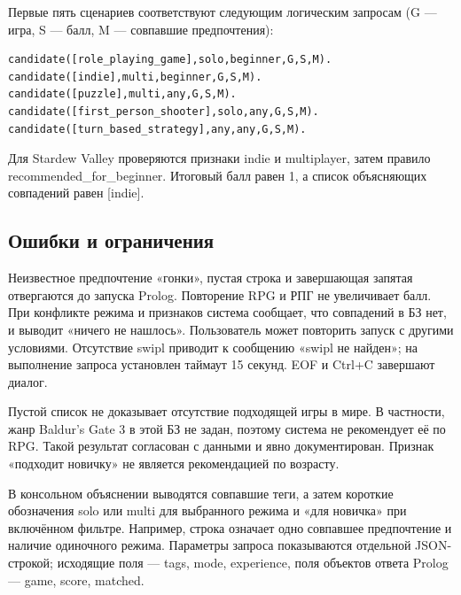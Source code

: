 \noindent\begin{minipage}{\linewidth}
Первые пять сценариев соответствуют следующим логическим запросам
(G --- игра, S --- балл, M --- совпавшие предпочтения):
\begin{lstlisting}
candidate([role_playing_game],solo,beginner,G,S,M).
candidate([indie],multi,beginner,G,S,M).
candidate([puzzle],multi,any,G,S,M).
candidate([first_person_shooter],solo,any,G,S,M).
candidate([turn_based_strategy],any,any,G,S,M).
\end{lstlisting}
\end{minipage}\par
Для Stardew Valley проверяются признаки indie и multiplayer, затем правило
recommended\_for\_beginner. Итоговый балл равен 1,
а список объясняющих совпадений равен [indie].

\subsection{Ошибки и ограничения}
Неизвестное предпочтение «гонки», пустая строка и завершающая запятая отвергаются
до запуска Prolog. Повторение RPG и РПГ не увеличивает балл.
При конфликте режима и признаков система сообщает, что совпадений в БЗ нет,
и выводит «ничего не нашлось». Пользователь может повторить запуск с другими условиями.
Отсутствие swipl приводит к сообщению «swipl не найден»;
на выполнение запроса установлен таймаут 15 секунд. EOF и Ctrl+C завершают диалог.

Пустой список не доказывает отсутствие подходящей игры в мире.
В частности, жанр Baldur's Gate 3 в этой БЗ не задан, поэтому система не
рекомендует её по RPG. Такой результат согласован с данными и явно документирован.
Признак «подходит новичку» не является рекомендацией по возрасту.

В консольном объяснении выводятся совпавшие теги, а затем короткие обозначения
solo или multi для выбранного режима и «для новичка» при включённом фильтре.
Например, строка  означает одно
совпавшее предпочтение и наличие одиночного режима. Параметры запроса
показываются отдельной JSON-строкой; исходящие поля --- tags, mode, experience,
поля объектов ответа Prolog --- game, score, matched.
